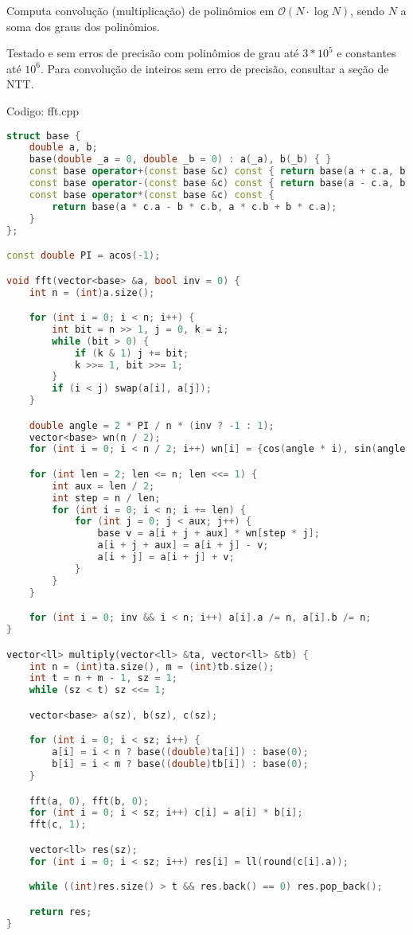 \documentclass[10pt, a4paper, oneside]{book}
\begin{document}
Computa convolução (multiplicação) de polinômios em $\mathcal{O}(N \cdot \log N)$, sendo $N$ a soma dos graus dos polinômios.



Testado e sem erros de precisão com polinômios de grau até $3 * 10^5$ e constantes até $10^6$. Para convolução de inteiros sem erro de precisão, consultar a seção de NTT.

\hfill

Codigo: fft.cpp

\begin{lstlisting}[language=C++]
struct base {
    double a, b;
    base(double _a = 0, double _b = 0) : a(_a), b(_b) { }
    const base operator+(const base &c) const { return base(a + c.a, b + c.b); }
    const base operator-(const base &c) const { return base(a - c.a, b - c.b); }
    const base operator*(const base &c) const {
        return base(a * c.a - b * c.b, a * c.b + b * c.a);
    }
};

const double PI = acos(-1);

void fft(vector<base> &a, bool inv = 0) {
    int n = (int)a.size();

    for (int i = 0; i < n; i++) {
        int bit = n >> 1, j = 0, k = i;
        while (bit > 0) {
            if (k & 1) j += bit;
            k >>= 1, bit >>= 1;
        }
        if (i < j) swap(a[i], a[j]);
    }

    double angle = 2 * PI / n * (inv ? -1 : 1);
    vector<base> wn(n / 2);
    for (int i = 0; i < n / 2; i++) wn[i] = {cos(angle * i), sin(angle * i)};

    for (int len = 2; len <= n; len <<= 1) {
        int aux = len / 2;
        int step = n / len;
        for (int i = 0; i < n; i += len) {
            for (int j = 0; j < aux; j++) {
                base v = a[i + j + aux] * wn[step * j];
                a[i + j + aux] = a[i + j] - v;
                a[i + j] = a[i + j] + v;
            }
        }
    }

    for (int i = 0; inv && i < n; i++) a[i].a /= n, a[i].b /= n;
}

vector<ll> multiply(vector<ll> &ta, vector<ll> &tb) {
    int n = (int)ta.size(), m = (int)tb.size();
    int t = n + m - 1, sz = 1;
    while (sz < t) sz <<= 1;

    vector<base> a(sz), b(sz), c(sz);

    for (int i = 0; i < sz; i++) {
        a[i] = i < n ? base((double)ta[i]) : base(0);
        b[i] = i < m ? base((double)tb[i]) : base(0);
    }

    fft(a, 0), fft(b, 0);
    for (int i = 0; i < sz; i++) c[i] = a[i] * b[i];
    fft(c, 1);

    vector<ll> res(sz);
    for (int i = 0; i < sz; i++) res[i] = ll(round(c[i].a));

    while ((int)res.size() > t && res.back() == 0) res.pop_back();

    return res;
}
\end{lstlisting}
\hfill
\end{document}
